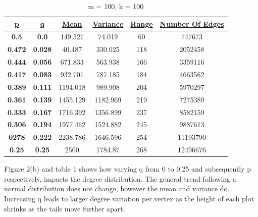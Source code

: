 \documentclass[12pt,a4paper]{article}
\begin{document}
\begin{table}[]
	\centering
	\caption{m = 100, k = 100}
	\begin{tabular}{|c|c|c|c|c|c|}
		\hline
		{\ul \textbf{p}} & {\ul \textbf{q}} & {\ul \textbf{Mean}} & {\ul \textbf{Variance}} & {\ul \textbf{Range}} & {\ul \textbf{Number Of Edges}} \\ \hline
		\textbf{0.5}     & \textbf{0.0}     & 149.527            & 74.019                  & 60                   & 747673                       \\ \hline
		\textbf{0.472}   & \textbf{0.028}   &  40.487           &  330.025                & 118                   & 2052458                     \\ \hline
		\textbf{0.444}   & \textbf{0.056}   &  671.833            & 563.938               & 166                   & 3359116                     \\ \hline
		\textbf{0.417}   & \textbf{0.083}   & 932.701            & 787.185            & 184                   & 4663562                      \\ \hline
		\textbf{0.389}   & \textbf{0.111}   & 1194.018           & 989.908               & 204                   & 5970297                    \\ \hline
		\textbf{0.361}   & \textbf{0.139}   & 1455.129           & 1182.969                & 219                  &7275389                     \\ \hline
		\textbf{0.333}   & \textbf{0.167}   & 1716.392            & 1356.899                &  237                 &8582159                      \\ \hline
		\textbf{0.306}   & \textbf{0.194}   & 1977.462			  & 1524.882                & 245                   & 9887613                   \\ \hline
		\textbf{0278}    & \textbf{0.222}   & 2238.786           &  1646.596                & 254                  & 11193790                      \\ \hline
		\textbf{0.25}    & \textbf{0.25}    & 2500             & 1784.87                & 268                  &12496676                      \\ \hline
	\end{tabular}
\end{table}


Figure 2(b) and table 1 shows how varying q from 0 to 0.25 and subsequently p respectively, impacts the degree distribution. The general trend following a normal distribution does not change, however the mean and variance do. Increasing q leads to larger degree variation per vertex as the height of each plot shrinks as the tails move further apart. 
\end{document}
